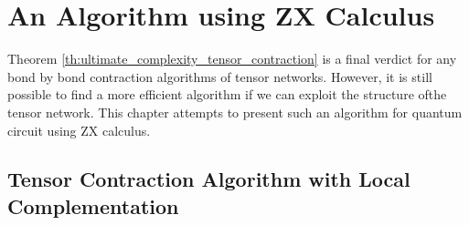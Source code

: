 \chapter{An Algorithm using ZX Calculus} \label{ch:zx-algorithms}

Theorem \ref{th:ultimate_complexity_tensor_contraction} is a final verdict for any bond by bond contraction algorithms of tensor networks.
However, it is still possible to find a more efficient algorithm if we can exploit the structure ofthe tensor network.
This chapter attempts to present such an algorithm for quantum circuit using ZX calculus.

\section{Tensor Contraction Algorithm with Local Complementation}

